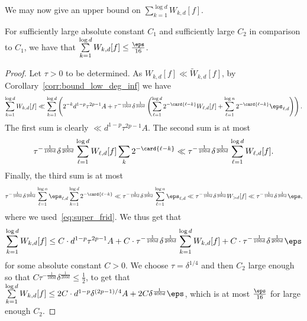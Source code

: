   We may now give an upper bound on $\sum\limits_{k=1}^{\log d} W_{k,d}[f]$.
  \begin{claim}\label{claim:bd_outside_junta}
  For sufficiently large absolute constant $C_1$ and sufficiently large $C_2$ in comparison to $C_1$, we have that
    $\sum\limits_{k=1}^{\log d} W_{k,d}[f]\leq \frac{\eps}{16}$.
  \end{claim}
  \begin{proof}
    Let $\tau>0$ to be determined. As $W_{k,d}[f]\ll \tilde{W}_{k,d}[f]$, by Corollary~\ref{corr:bound_low_deg_inf} we have
    \[
    \sum\limits_{k=1}^{\log d} W_{k,d}[f]
    \ll
    \sum\limits_{k=1}^{\log d}
    \left(2^{-k}d^{1-p}\tau^{2p-1} A
    +\tau^{-\frac{1}{100 d}}\delta^{\frac{1}{200 d}}
    \left(\sum\limits_{\ell=1}^{\log d} 2^{-\card{\ell-k}}W_{\ell,d}[f]+\sum\limits_{\ell=1}^{\log n} 2^{-\card{\ell-k}}\eps_{\ell, d}\right)
    \right).
    \]
    The first sum is clearly $\ll d^{1-p}\tau^{2p-1} A$. The second sum is at most
    \[
    \tau^{-\frac{1}{100 d}}\delta^{\frac{1}{200 d}}
    \sum\limits_{\ell=1}^{\log d}W_{\ell,d}[f] \sum\limits_{k} 2^{-\card{\ell-k}}
    \ll \tau^{-\frac{1}{100 d}}\delta^{\frac{1}{200 d}}\sum\limits_{\ell=1}^{\log d} W_{\ell,d}[f].
    \]
    Finally, the third sum is at most
    \[
    \tau^{-\frac{1}{100 d}}\delta^{\frac{1}{200 d}}
    \sum\limits_{\ell=1}^{\log n} \eps_{\ell, d}
    \sum\limits_{k=1}^{\log d} 2^{-\card{\ell-k}}
    \ll
    \tau^{-\frac{1}{100 d}}\delta^{\frac{1}{200 d}}
    \sum\limits_{\ell=1}^{\log n} \eps_{\ell, d}
    \ll
    \tau^{-\frac{1}{100 d}}\delta^{\frac{1}{200 d}}
    W_{>d}[f]
    \ll \tau^{-\frac{1}{100 d}}\delta^{\frac{1}{200 d}}\eps,
    \]
    where we used~\eqref{eq:super_frid}.
    We thus get that
    \[
    \sum\limits_{k=1}^{\log d} W_{k,d}[f]
    \leq
    C\cdot d^{1-p}\tau^{2p-1} A
    +C\cdot \tau^{-\frac{1}{100 d}}\delta^{\frac{1}{200 d}}\sum\limits_{k=1}^{\log d} W_{k,d}[f]
    +C\cdot \tau^{-\frac{1}{100 d}}\delta^{\frac{1}{200 d}}\eps
    \]
    for some absolute constant $C>0$. We choose $\tau = \delta^{1/4}$ and then $C_2$ large enough so that
    $C\tau^{-\frac{1}{100 d}}\delta^{\frac{1}{200 d}}\leq \frac{1}{2}$, to get that
    $\sum\limits_{k=1}^{\log d} W_{k,d}[f]\leq 2C\cdot d^{1-p}\delta^{(2p-1)/4} A + 2C\delta^{\frac{1}{400 d}}\eps$,
    which is at most $\frac{\eps}{16}$ for large enough $C_2$.
  \end{proof}

